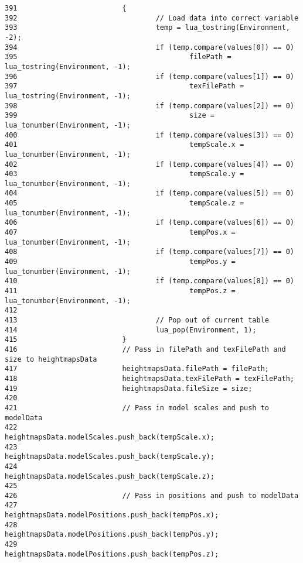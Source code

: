 \begin{Code}
\begin{verbatim}
391                         {
392                                 // Load data into correct variable
393                                 temp = lua_tostring(Environment, -2);
394                                 if (temp.compare(values[0]) == 0)
395                                         filePath = lua_tostring(Environment, -1);
396                                 if (temp.compare(values[1]) == 0)
397                                         texFilePath = lua_tostring(Environment, -1);
398                                 if (temp.compare(values[2]) == 0)
399                                         size = lua_tonumber(Environment, -1);
400                                 if (temp.compare(values[3]) == 0)
401                                         tempScale.x = lua_tonumber(Environment, -1);
402                                 if (temp.compare(values[4]) == 0)
403                                         tempScale.y = lua_tonumber(Environment, -1);
404                                 if (temp.compare(values[5]) == 0)
405                                         tempScale.z = lua_tonumber(Environment, -1);
406                                 if (temp.compare(values[6]) == 0)
407                                         tempPos.x = lua_tonumber(Environment, -1);
408                                 if (temp.compare(values[7]) == 0)
409                                         tempPos.y = lua_tonumber(Environment, -1);
410                                 if (temp.compare(values[8]) == 0)
411                                         tempPos.z = lua_tonumber(Environment, -1);
412 
413                                 // Pop out of current table
414                                 lua_pop(Environment, 1);
415                         }
416                         // Pass in filePath and texFilePath and size to heightmapsData
417                         heightmapsData.filePath = filePath;
418                         heightmapsData.texFilePath = texFilePath;
419                         heightmapsData.fileSize = size;
420 
421                         // Pass in model scales and push to modelData
422                         heightmapsData.modelScales.push_back(tempScale.x);
423                         heightmapsData.modelScales.push_back(tempScale.y);
424                         heightmapsData.modelScales.push_back(tempScale.z);
425 
426                         // Pass in positions and push to modelData
427                         heightmapsData.modelPositions.push_back(tempPos.x);
428                         heightmapsData.modelPositions.push_back(tempPos.y);
429                         heightmapsData.modelPositions.push_back(tempPos.z);

\end{verbatim}
\end{Code}
